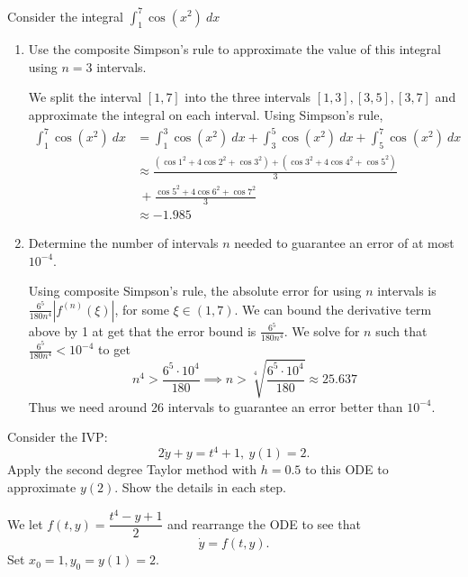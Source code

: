 \documentclass{eh-homework}
\begin{document}
    \begin{question}{3}
        Consider the integral \(\int _1^7 \cos (x^2)\ dx\)
        \begin{enumerate}[label=(\alph*)]
            \item Use the composite Simpson's rule to approximate the value of this integral using \(n=3\) intervals.
            
            We split the interval \([1,7]\) into the three intervals \([1,3], [3,5],[3,7]\) and approximate the integral on each interval. Using Simpson's rule,
            \begin{align*}
                \int _1^7 \cos (x^2)\ dx &= \int _1^3 \cos (x^2)\ dx + \int _3^5 \cos (x^2)\ dx + \int _5^7 \cos (x^2)\ dx \\
                &\approx \frac{(\cos 1^2 + 4 \cos 2^2 + \cos 3^2) + (\cos 3^2 + 4 \cos 4^2 + \cos 5^2)}{3} \\
                &\ + \frac{\cos 5^2 + 4 \cos 6^2 + \cos 7^2}{3} \\
                &\approx -1.985
            \end{align*}
            \item Determine the number of intervals \(n\) needed to guarantee an error of at most \(10^{-4}\).
            
            Using composite Simpson's rule, the absolute error for using \(n\) intervals is \(\frac{6^5}{180n^4}|f^{(n)}(\xi)|\), for some \(\xi \in (1,7)\). We can bound the derivative term above by 1 at get that the error bound is \(\frac{6^5}{180n^4}\). We solve for \(n\) such that \(\frac{6^5}{180n^4} < 10^{-4}\) to get
            \[
                n^4 > \frac{6^5 \cdot 10^4}{180} \implies n > \sqrt[4]{\frac{6^5 \cdot 10^4}{180}} \approx 25.637
            \]
            Thus we need around 26 intervals to guarantee an error better than \(10^{-4}\).
        \end{enumerate}
    \end{question}
    \begin{question}{4}
        Consider the IVP:
        \[
            2\dot y + y = t^4 + 1,\ y(1) = 2.
        \]
        Apply the second degree Taylor method with \(h = 0.5\) to this ODE to approximate \(y(2)\). Show the details in each step.

        \medskip

        We let \(f(t,y) = \dfrac{t^4 - y + 1}{2}\) and rearrange the ODE to see that
        \[
            \dot y = f(t,y).
        \]
        Set \(x_0 = 1, y_0 = y(1) = 2\).
    \end{question}
\end{document}
